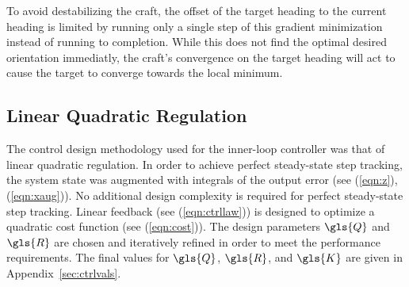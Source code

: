\documentclass{sydeStyle}
\begin{document}
To avoid destabilizing the craft, the offset of the target heading to the
current heading is limited by running only a single step of this gradient
minimization instead of running to completion. While this does not find the
optimal desired orientation immediatly, the craft's convergence on the target
heading will act to cause the target to converge towards the local minimum.

\subsection{Linear Quadratic Regulation}
\label{sec:lqr}

The control design methodology used for the inner-loop controller was that of
linear quadratic regulation.  In order to achieve perfect steady-state step
tracking, the system state was augmented with integrals of the output error (see
(\ref{eqn:z}), (\ref{eqn:xaug})).  No additional design complexity is required
for perfect steady-state step tracking.  Linear feedback (see
(\ref{eqn:ctrllaw})) is designed to optimize a quadratic cost function (see
(\ref{eqn:cost})).  The design parameters $\gls{Q}$ and $\gls{R}$ are chosen and
iteratively refined in order to meet the performance requirements.  The final
values for $\gls{Q}$, $\gls{R}$, and $\gls{K}$ are given in
Appendix~\ref{sec:ctrlvals}.

\end{document}
